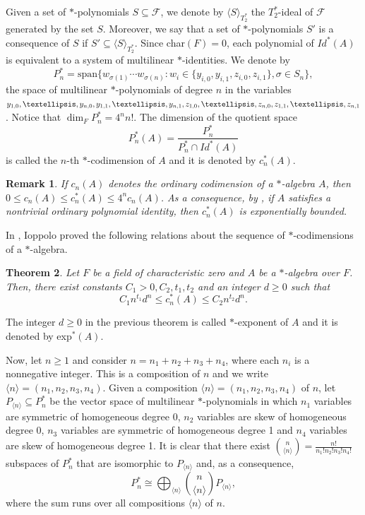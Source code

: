 \documentclass[10pt,a4paper]{amsart}
\newtheorem{theorem}{Theorem}[section]
\newtheorem{remark}[theorem]{Remark}
\begin{document}
	Given a set of $*$-polynomials $S \subseteq \mathcal{F}$, we denote by $\langle S \rangle_{T_2^*}$ the $T_2^*$-ideal of $\mathcal{F}$ generated by the set $S$. Moreover, we say that a set of $*$-polynomials $S'$ is a consequence of $S$ if $S' \subseteq \langle S \rangle_{T_2^*}$. Since char$(F) =0$, each polynomial of $Id^*(A)$ is
	equivalent to a system of multilinear $*$-identities. We denote by
	$$
	P_{n}^{*} = \textrm{span}\{w_{\sigma(1)} \cdots w_{\sigma(n)}: w_{i} \in \{y_{i,0},y_{i,1},z_{i,0},z_{i,1}\}, \sigma \in S_{n}\},
	$$ 
	the space of multilinear $*$-polynomials of degree $n$ in the variables $y_{1,0},  \ldots , y_{n,0}, \\ y_{1,1}, \ldots, y_{n,1}, z_{1,0}, \ldots, z_{n,0}, z_{1,1},  \ldots, z_{n,1}$. Notice that $\dim_FP_n^*=4^nn!$. The dimension of the quotient space
	$$P_n^{*}(A)=\displaystyle \frac{P_n^{*}}{P_n^{*}\cap Id^*(A)}$$ is called the $n$-th $*$-codimension of $A$ and it is denoted by  $c_n^*(A)$.
	
	\begin{remark}
		If $c_n(A)$ denotes the ordinary codimension of a $*$-algebra $A$, then $0\leq c_n(A)\leq c_n^*(A) \leq 4^nc_n(A)$. As a consequence, by \cite{Regev}, if $A$ satisfies a nontrivial ordinary polynomial identity, then $c_n^*(A)$ is exponentially bounded.
	\end{remark}
	
	In \cite{Ninni}, Ioppolo proved the following relations about the sequence of $*$-codimensions of a $*$-algebra. 
	
	\begin{theorem}
		Let $F$ be a field of characteristic zero and $A$ be a $*$-algebra over $F$. Then, there exist constants $C_1>0, C_2, t_1, t_2$ and an integer $d\geq 0$ such that $$C_1n^{t_1}d^n\leq c_n^*(A)\leq C_2n^{t_2}d^n.$$
	\end{theorem}
	
	The integer $d\geq 0$ in the previous theorem is called $*$-exponent of $A$ and it is denoted by exp$^*(A)$.
	
	Now, let $n\geq 1$ and consider $n=n_1+n_2+n_3+n_4$, where each $n_i$ is a nonnegative integer. This is a composition of $n$ and we write $\langle n\rangle=(n_1,n_2,n_3,n_4)$. Given a composition $\langle n\rangle=(n_1,n_2,n_3,n_4)$ of $n$, let $P_{\langle n\rangle}\subseteq P_n^*$ be the vector space of multilinear $*$-po\-ly\-no\-mi\-als in which $n_1$ variables are symmetric of homogeneous degree 0, $n_2$ variables are skew of homogeneous degree 0, $n_3$ variables are symmetric of homogeneous degree 1 and $n_4$ variables are skew of homogeneous degree 1. It is clear that there exist $\binom{n}{{\langle n\rangle}}=\frac{n!}{n_1!n_2!n_3!n_4!}$ subspaces of $P_n^*$ that are isomorphic to $P_{\langle n\rangle}$ and, as a consequence, $$ P_n^*\cong \bigoplus_{{\langle n\rangle}}\binom{n}{{\langle n\rangle}}P_{{\langle n\rangle}},$$  where the sum runs over all compositions $\langle n\rangle$ of $n$. 
	
\end{document}
